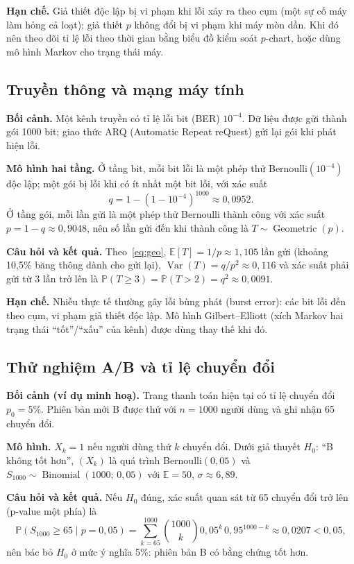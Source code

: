 \documentclass[12pt,a4paper]{article}
\theoremstyle{definition}
\theoremstyle{remark}
\newcommand{\Prob}{\mathbb{P}}
\newcommand{\E}{\mathbb{E}}
\newcommand{\Var}{\operatorname{Var}}
\newcommand{\Bin}{\operatorname{Binomial}}
\newcommand{\Geo}{\operatorname{Geometric}}
\begin{document}
\textbf{Hạn chế.} Giả thiết độc lập bị vi phạm khi lỗi xảy ra theo cụm (một sự cố máy làm hỏng cả loạt); giả
thiết $p$ không đổi bị vi phạm khi máy mòn dần. Khi đó nên theo dõi tỉ lệ lỗi theo thời gian bằng biểu đồ kiểm
soát $p$-chart, hoặc dùng mô hình Markov cho trạng thái máy.

\subsection{Truyền thông và mạng máy tính}\label{sec:app-net}
\textbf{Bối cảnh.} Một kênh truyền có tỉ lệ lỗi bit (BER) $10^{-4}$. Dữ liệu được gửi thành gói 1000 bit; giao
thức ARQ (Automatic Repeat reQuest) gửi lại gói khi phát hiện lỗi.

\textbf{Mô hình hai tầng.} Ở tầng bit, mỗi bit lỗi là một phép thử Bernoulli$(10^{-4})$ độc lập; một gói bị lỗi
khi có ít nhất một bit lỗi, với xác suất
\begin{equation}
  q = 1 - (1-10^{-4})^{1000} \approx 0{,}0952 .
\end{equation}
Ở tầng gói, mỗi lần gửi là một phép thử Bernoulli thành công với xác suất $p = 1-q \approx 0{,}9048$, nên số lần
gửi đến khi thành công là $T\sim\Geo(p)$.

\textbf{Câu hỏi và kết quả.} Theo~\eqref{eq:geo},
$\E[T] = 1/p \approx 1{,}105$ lần gửi (khoảng 10,5\% băng thông dành cho gửi lại),
$\Var(T) = q/p^2 \approx 0{,}116$ và xác suất phải gửi từ 3 lần trở lên là
$\Prob(T\ge3) = \Prob(T>2) = q^2 \approx 0{,}0091$.

\textbf{Hạn chế.} Nhiễu thực tế thường gây lỗi bùng phát (burst error): các bit lỗi đến theo cụm, vi phạm giả
thiết độc lập. Mô hình Gilbert--Elliott (xích Markov hai trạng thái ``tốt''/``xấu'' của kênh) được dùng thay thế
khi đó.

\subsection{Thử nghiệm A/B và tỉ lệ chuyển đổi}\label{sec:app-ab}
\textbf{Bối cảnh (ví dụ minh hoạ).} Trang thanh toán hiện tại có tỉ lệ chuyển đổi $p_0 = 5\%$. Phiên bản mới B
được thử với $n = 1000$ người dùng và ghi nhận 65 chuyển đổi.

\textbf{Mô hình.} $X_k = 1$ nếu người dùng thứ $k$ chuyển đổi. Dưới giả thuyết $H_0$: ``B không tốt hơn'',
$(X_k)$ là quá trình Bernoulli$(0{,}05)$ và $S_{1000}\sim\Bin(1000;\,0{,}05)$ với $\E = 50$,
$\sigma\approx6{,}89$.

\textbf{Câu hỏi và kết quả.} Nếu $H_0$ đúng, xác suất quan sát từ 65 chuyển đổi trở lên (p-value một phía) là
\begin{equation}
  \Prob(S_{1000}\ge 65 \mid p = 0{,}05) = \sum_{k=65}^{1000}\binom{1000}{k}0{,}05^k\,0{,}95^{1000-k}
  \approx 0{,}0207 < 0{,}05,
\end{equation}
nên bác bỏ $H_0$ ở mức ý nghĩa 5\%: phiên bản B có bằng chứng tốt hơn.
\end{document}
